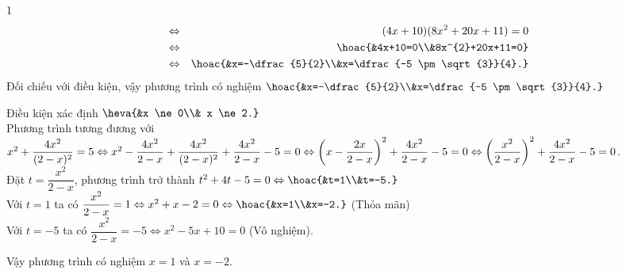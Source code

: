 \begin{bt}
{\begin{enumEX}{1}
\begin{eqnarray*}
				& \Leftrightarrow &  (4x+10)(8x^{2}+20x+11)=0 \\
				& \Leftrightarrow & \hoac{&4x+10=0\\&8x^{2}+20x+11=0} \\
				& \Leftrightarrow &\hoac{&x=-\dfrac{5}{2}\\&x=\dfrac{-5 \pm \sqrt{3}}{4}.}
			\end{eqnarray*}
			Đối chiếu với điều kiện, vậy phương trình có nghiệm $\hoac{&x=-\dfrac{5}{2}\\&x=\dfrac{-5 \pm \sqrt{3}}{4}.}$
			\item Điều kiện xác định $\heva{&x \ne 0\\& x \ne 2.}$\\
			Phương trình tương đương với\\ $x^{2}+\dfrac{4x^{2}}{(2-x)^{2}}=5 \Leftrightarrow x^{2}- \dfrac{4x^{2}}{2-x} +\dfrac{4x^{2}}{(2-x)^{2}} + \dfrac{4x^{2}}{2-x}-5=0 \Leftrightarrow \left( x-\dfrac{2x}{2-x}\right)^{2} + \dfrac{4x^{2}}{2-x}-5=0 \\ \Leftrightarrow \left(\dfrac{x^{2}}{2-x} \right)^{2} + \dfrac{4x^{2}}{2-x}-5=0$.\\
			Đặt $t=\dfrac{x^{2}}{2-x}$, phương trình trở thành $t^{2}+4t-5=0 \Leftrightarrow \hoac{&t=1\\&t=-5.}$\\
			Với $t=1$ ta có $\dfrac{x^{2}}{2-x} =1 \Leftrightarrow x^{2}+x-2=0 \Leftrightarrow \hoac{&x=1\\&x=-2.}$ (Thỏa mãn)\\
			Với $t=-5$ ta có $\dfrac{x^{2}}{2-x} =-5	 \Leftrightarrow x^{2}-5x+10=0$ (Vô nghiệm).
				
		Vậy phương trình có nghiệm $x=1$ và $x=-2$.
		\end{enumEX}
	}		
\end{bt}

